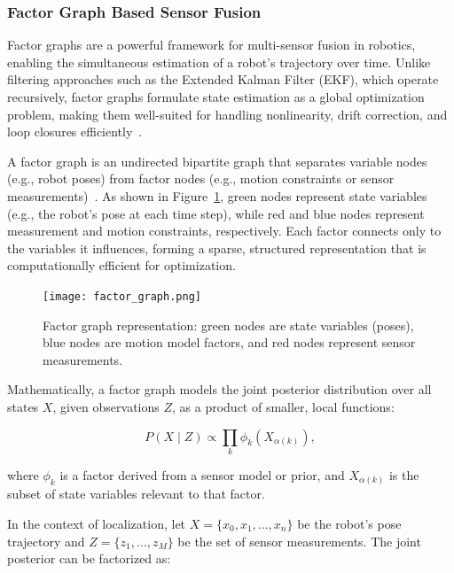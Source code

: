 \subsubsection{Factor Graph Based Sensor Fusion}

Factor graphs are a powerful framework for multi-sensor fusion in robotics, enabling the simultaneous estimation of a robot’s trajectory over time. Unlike filtering approaches such as the Extended Kalman Filter (EKF), which operate recursively, factor graphs formulate state estimation as a global optimization problem, making them well-suited for handling nonlinearity, drift correction, and loop closures efficiently~\cite{cadena2016past,dellaert2017factor}.

A factor graph is an undirected bipartite graph that separates variable nodes (e.g., robot poses) from factor nodes (e.g., motion constraints or sensor measurements)~\cite{kschischang1998factor}. As shown in Figure~\ref{fig:factor_graph}, green nodes represent state variables (e.g., the robot’s pose at each time step), while red and blue nodes represent measurement and motion constraints, respectively. Each factor connects only to the variables it influences, forming a sparse, structured representation that is computationally efficient for optimization.

\begin{figure}[ht]
    \centering
    \texttt{[image: factor\_graph.png]}
    \caption{Factor graph representation: green nodes are state variables (poses), blue nodes are motion model factors, and red nodes represent sensor measurements.}
    \label{fig:factor_graph}
\end{figure}

Mathematically, a factor graph models the joint posterior distribution over all states $X$, given observations $Z$, as a product of smaller, local functions:

\begin{equation}
P(X \mid Z) \propto \prod_k \phi_k(X_{\alpha(k)}),
\label{eq:fg_joint}
\end{equation}

where $\phi_k$ is a factor derived from a sensor model or prior, and $X_{\alpha(k)}$ is the subset of state variables relevant to that factor.

In the context of localization, let $X = \{x_0, x_1, \dots, x_n\}$ be the robot’s pose trajectory and $Z = \{z_1, \dots, z_M\}$ be the set of sensor measurements. The joint posterior can be factorized as:

